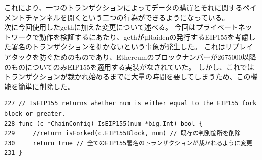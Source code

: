 これにより、一つのトランザクションによってデータの購買とそれに関するペイメントチャンネルを開くという二つの行為ができるようになっている。 \\
次に今回使用したgethに加えた変更について述べる。
今回はプライベートネットワークで動作を検証するにあたり、gethがμRaidenの発行するEIP155を考慮した署名のトランザクションを捌かないという事象が発生した。
これはリプレイアタックを防ぐためのものであり、Ethereumのブロックナンバーが2675000以降のものについてのみEIP155を適用する実装がなされていた。
しかし、これではトランザクションが裁かれ始めるまでに大量の時間を要してしまうため、この機能を簡単に削除した。
\begin{lstlisting}[caption=gethのEIP155のフォーク確認機能の削除 params/config.go ,label=EIP155]
227 // IsEIP155 returns whether num is either equal to the EIP155 fork block or greater.
228 func (c *ChainConfig) IsEIP155(num *big.Int) bool {
229     //return isForked(c.EIP155Block, num) // 既存の判別箇所を削除
230     return true // 全てのEIP155署名のトランザクションが裁かれるように変更
231 }
\end{lstlisting}

